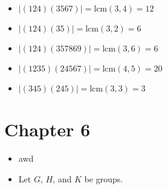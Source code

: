 \documentclass[12pt]{article}
\newcommand{\vertb}[1]{\left\vert#1\right\vert}      %
\begin{document}
\begin{itemize}
\begin{spacing}{1}
\begin{itemize}
        \item [a.)] $\vertb{(124)(3567)}=\text{lcm}(3,4)=12$

        \item [c.)] $\vertb{(124)(35)}=\text{lcm}(3,2)=6$

        \item [d.)] $\vertb{(124)(357869)}=\text{lcm}(3,6)=6$

        \item [e.)] $\vertb{(1235)(24567)}=\text{lcm}(4,5)=20$

        \item [f.)] $\vertb{(345)(245)}=\text{lcm}(3,3)=3$
    \end{itemize}

    \end{spacing}
\end{itemize}

\section*{Chapter 6}
\begin{itemize}
    \item [1.)] awd
   
    \item [6.)] Let $G$, $H$, and $K$ be groups.
\end{itemize}
\end{document}
